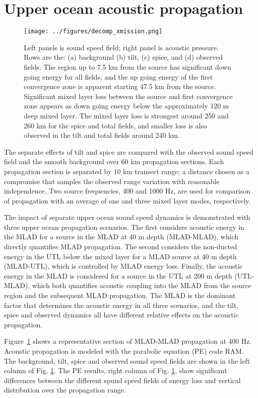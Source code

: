\documentclass[preprint,NumberedRefs]{JASA}
\begin{document}
\section{\label{sec:propagation}Upper ocean acoustic propagation}
\begin{figure}
\texttt{[image: ../figures/decomp\_xmission.png]}
    \caption{\label{fig:decomp_x}{Left panels is sound speed field; right panel is acoustic pressure. Rows are the: (a) background (b) tilt, (c) spice, and (d) observed fields. The region up to 7.5 km from the source has significant down going energy for all fields, and the up going energy of the first convergence zone is apparent starting 47.5 km from the source. Significant mixed layer loss between the source and first convergence zone appears as down going energy below the approximately 120 m deep mixed layer. The mixed layer loss is strongest around 250 and 260 km for the spice and total fields, and smaller loss is also observed in the tilt and total fields around 240 km.}}
\end{figure}

The separate effects of tilt and spice are compared with the observed sound speed field and the smooth background over 60 km propagation sections. Each propagation section is separated by 10 km transect range; a distance chosen as a compromise that samples the observed range variation with reasonable independence. Two source frequencies, 400 and 1000 Hz, are used for comparison of propagation with an average of one and three mixed layer modes, respectively.

The impact of separate upper ocean sound speed dynamics is demonstrated with three upper ocean propagation scenarios. The first considers acoustic energy in the MLAD for a source in the MLAD at 40 m depth (MLAD-MLAD), which directly quantifies MLAD propagation. The second considers the non-ducted energy in the UTL below the mixed layer for a MLAD source at 40 m depth (MLAD-UTL), which is controlled by MLAD energy loss. Finally, the acoustic energy in the MLAD is considered for a source in the UTL at 200 m depth (UTL-MLAD), which both quantifies acoustic coupling into the MLAD from the source region and the subsequent MLAD propagation. The MLAD is the dominant factor that determines the acoustic energy in all three scenarios, and the tilt, spice and observed dynamics all have different relative effects on the acoustic propagation.

Figure~\ref{fig:decomp_x} shows a representative section of MLAD-MLAD propagation at 400 Hz. Acoustic propagation is modeled with the parabolic equation (PE) code RAM\citep{collins93}. The background, tilt, spice and observed sound speed fields are shown in the left column of Fig. \ref{fig:decomp_x}. The PE results, right column  of Fig. \ref{fig:decomp_x}, show significant differences between the different spund speed fields of energy loss and vertical distribution over the propagation range.
\end{document}
